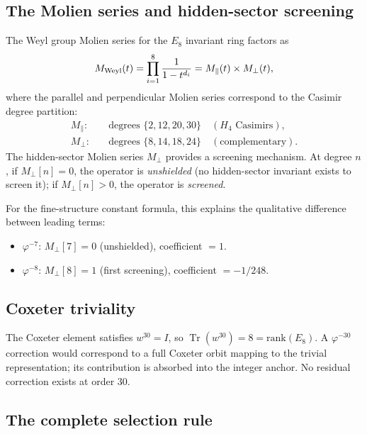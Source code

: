 \documentclass[aps,prd,twocolumn,superscriptaddress,nofootinbib,showpacs]{revtex4-2}
\newcommand{\Tr}{\operatorname{Tr}}
\begin{document}
\subsection{The Molien series and hidden-sector screening}
\label{sec:molien}

The Weyl group Molien series for the $E_8$ invariant ring factors as
\begin{equation}
M_{\rm Weyl}(t) = \prod_{i=1}^{8} \frac{1}{1-t^{d_i}} =
M_\parallel(t) \times M_\perp(t),
\label{eq:molien}
\end{equation}
where the parallel and perpendicular Molien series correspond to the
Casimir degree partition:
\begin{align}
M_\parallel: &\quad \text{degrees } \{2,12,20,30\} \quad (H_4\text{ Casimirs}),
\label{eq:mpar} \\
M_\perp: &\quad \text{degrees } \{8,14,18,24\} \quad (\text{complementary}).
\label{eq:mperp}
\end{align}
The hidden-sector Molien series $M_\perp$ provides a screening
mechanism.  At degree $n$, if $M_\perp[n] = 0$, the operator is
\emph{unshielded} (no hidden-sector invariant exists to screen it);
if $M_\perp[n] > 0$, the operator is \emph{screened}.

For the fine-structure constant formula, this explains the qualitative
difference between leading terms:
\begin{itemize}
\item $\varphi^{-7}$: $M_\perp[7] = 0$ (unshielded), coefficient $= 1$.
\item $\varphi^{-8}$: $M_\perp[8] = 1$ (first screening), coefficient
$= -1/248$.
\end{itemize}

\subsection{Coxeter triviality}\label{sec:rule3}

The Coxeter element satisfies $w^{30} = I$, so $\Tr(w^{30}) = 8 =
\text{rank}(E_8)$.  A $\varphi^{-30}$ correction would correspond to
a full Coxeter orbit mapping to the trivial representation; its
contribution is absorbed into the integer anchor.  No residual
correction exists at order 30.

\subsection{The complete selection rule}\label{sec:completerule}
\end{document}
